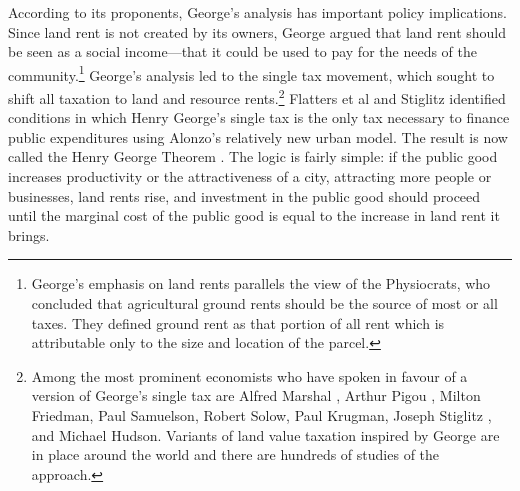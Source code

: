 
According to its proponents, George's analysis  has important policy implications. Since land rent is not created by its owners, George argued that land rent should be seen as a social income---that it could be used to pay for the needs of the community.\footnote{George's emphasis on land rents parallels the view of the Physiocrats, who concluded that agricultural \gls{ground rents} should be the source of most or all taxes. They defined ground rent as that portion of all rent which is attributable only to the size and location of the parcel.} %
George's analysis led to the {single tax} movement, which sought to shift all taxation to land  and resource rents.\footnote{Among the most prominent economists who have spoken in favour of a version of George's single tax are Alfred Marshal \cite{marshallPrinciplesEconomics1890}, %
Arthur Pigou \cite{pigouPolicyLandTaxation1909}, Milton Friedman, Paul Samuelson, Robert Solow, Paul Krugman, Joseph Stiglitz \cite{stiglitzTheoryLocalPublic1977}, and %
Michael Hudson. Variants of land value taxation inspired by George are in place around the world and there are hundreds of studies of the approach.} 
Flatters et al \cite{flattersPublicGoodsEfficiency1974} and  Stiglitz \cite{stiglitzTheoryLocalPublic1977} identified  conditions in which Henry George's \gls{single tax} is the only tax necessary to finance public expenditures using Alonzo's relatively new urban model. The result is now called the \gls{Henry George Theorem} \cite{arnottAggregateLandRents1979}.
The logic is fairly simple: if the public good increases productivity or the attractiveness of a city, attracting more people or businesses, land rents rise, and investment in the public good should proceed until the marginal cost of the public good is equal to the increase in land rent it brings. %


